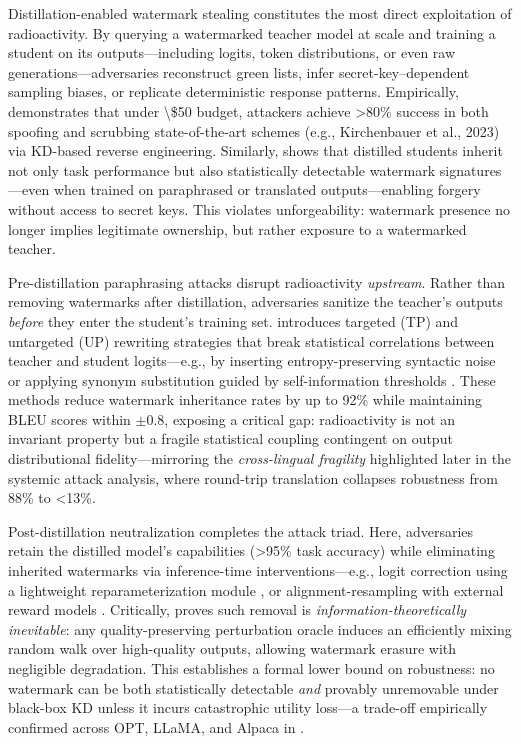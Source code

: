 \documentclass[11pt,a4paper]{article}
\begin{document}
Distillation-enabled watermark stealing constitutes the most direct exploitation of radioactivity. By querying a watermarked teacher model at scale and training a student on its outputs---including logits, token distributions, or even raw generations---adversaries reconstruct green lists, infer secret-key--dependent sampling biases, or replicate deterministic response patterns. Empirically, \cite{arxiv:2402.19361} demonstrates that under \textbackslash{}\$50 budget, attackers achieve >80\% success in both spoofing and scrubbing state-of-the-art schemes (e.g., Kirchenbauer et al., 2023) via KD-based reverse engineering. Similarly, \cite{arxiv:2002.12200} shows that distilled students inherit not only task performance but also statistically detectable watermark signatures---even when trained on paraphrased or translated outputs---enabling forgery without access to secret keys. This violates unforgeability: watermark presence no longer implies legitimate ownership, but rather exposure to a watermarked teacher.

Pre-distillation paraphrasing attacks disrupt radioactivity \emph{upstream}. Rather than removing watermarks after distillation, adversaries sanitize the teacher's outputs \emph{before} they enter the student's training set. \cite{arxiv:2402.14007} introduces targeted (TP) and untargeted (UP) rewriting strategies that break statistical correlations between teacher and student logits---e.g., by inserting entropy-preserving syntactic noise or applying synonym substitution guided by self-information thresholds \cite{arxiv:2505.05190}. These methods reduce watermark inheritance rates by up to 92\% while maintaining BLEU scores within $\pm$0.8, exposing a critical gap: radioactivity is not an invariant property but a fragile statistical coupling contingent on output distributional fidelity---mirroring the \emph{cross-lingual fragility} highlighted later in the systemic attack analysis, where round-trip translation collapses robustness from 88\% to <13\%.

Post-distillation neutralization completes the attack triad. Here, adversaries retain the distilled model's capabilities (>95\% task accuracy) while eliminating inherited watermarks via inference-time interventions---e.g., logit correction using a lightweight reparameterization module \cite{arxiv:2506.00359}, or alignment-resampling with external reward models \cite{arxiv:2403.10553}. Critically, \cite{arxiv:2505.06827} proves such removal is \emph{information-theoretically inevitable}: any quality-preserving perturbation oracle induces an efficiently mixing random walk over high-quality outputs, allowing watermark erasure with negligible degradation. This establishes a formal lower bound on robustness: no watermark can be both statistically detectable \emph{and} provably unremovable under black-box KD unless it incurs catastrophic utility loss---a trade-off empirically confirmed across OPT, LLaMA, and Alpaca in \cite{arxiv:2307.15593}.
\end{document}
